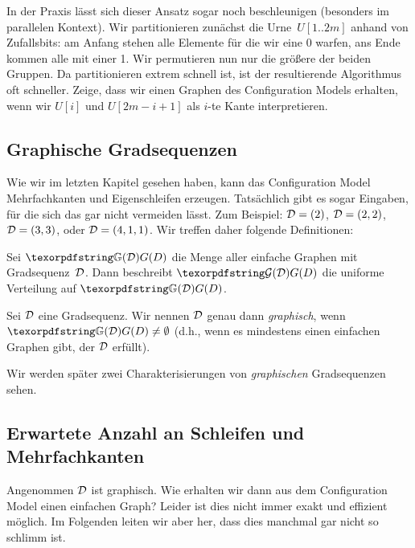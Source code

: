 \begin{exercise}
    In der Praxis lässt sich dieser Ansatz sogar noch beschleunigen (besonders im parallelen Kontext).
    Wir partitionieren zunächst die Urne~$U[1..2m]$ anhand von Zufallsbits:
    am Anfang stehen alle Elemente für die wir eine 0 warfen, ans Ende kommen alle mit einer 1.
    Wir permutieren nun nur die größere der beiden Gruppen.
    Da partitionieren extrem schnell ist, ist der resultierende Algorithmus oft schneller.
    Zeige, dass wir einen Graphen des Configuration Models erhalten, wenn wir $U[i]$ und $U[2m - i + 1]$ als $i$-te Kante interpretieren.
\end{exercise}

\subsection{Graphische Gradsequenzen}
Wie wir im letzten Kapitel gesehen haben, kann das Configuration Model Mehrfachkanten und Eigenschleifen erzeugen.
Tatsächlich gibt es sogar Eingaben, für die sich das gar nicht vermeiden lässt.
Zum Beispiel: $\mathcal{D} = (2)$, $\mathcal{D} = (2, 2)$, $\mathcal{D} = (3,3)$, oder $\mathcal{D} = (4, 1, 1)$.
Wir treffen daher folgende Definitionen:

\begin{definition}
    Sei $\gd$ die Menge aller einfache Graphen mit Gradsequenz~$\mathcal{D}$.
    Dann beschreibt $\Gd$ die uniforme Verteilung auf $\gd$.
\end{definition}

\begin{definition}
    Sei $\mathcal{D}$ eine Gradsequenz.
    Wir nennen $\mathcal{D}$ genau dann \emph{graphisch}, wenn $\gd \neq \emptyset$ (d.h., wenn es mindestens einen einfachen Graphen gibt, der $\mathcal{D}$ erfüllt).
\end{definition}

\noindent
Wir werden später zwei Charakterisierungen von \emph{graphischen} Gradsequenzen sehen.

\subsection{Erwartete Anzahl an Schleifen und Mehrfachkanten}\label{subsec:anzahl-illegaler-kanten}
Angenommen $\mathcal{D}$ ist graphisch.
Wie erhalten wir dann aus dem Configuration Model einen einfachen Graph?
Leider ist dies nicht immer exakt und effizient möglich.
Im Folgenden leiten wir aber her, dass dies manchmal gar nicht so schlimm ist.

